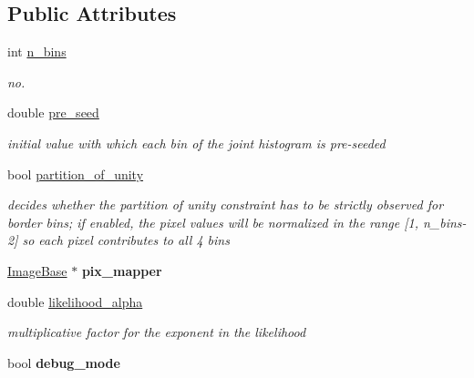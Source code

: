 \subsection*{Public Attributes}
\begin{DoxyCompactItemize}
\item 
int \hyperlink{structMIParams_a2e0e6ee1bd5cab5498d929798333798d}{n\-\_\-bins}
\begin{DoxyCompactList}\small\item\em no. \end{DoxyCompactList}\item 
double \hyperlink{structMIParams_a08f5a14dae9f3109340a5761812acfcf}{pre\-\_\-seed}
\begin{DoxyCompactList}\small\item\em initial value with which each bin of the joint histogram is pre-\/seeded \end{DoxyCompactList}\item 
\hypertarget{structMIParams_a4ec0963865cdf4d11c598fd4a0b00c15}{bool \hyperlink{structMIParams_a4ec0963865cdf4d11c598fd4a0b00c15}{partition\-\_\-of\-\_\-unity}}\label{structMIParams_a4ec0963865cdf4d11c598fd4a0b00c15}

\begin{DoxyCompactList}\small\item\em decides whether the partition of unity constraint has to be strictly observed for border bins; if enabled, the pixel values will be normalized in the range \mbox{[}1, n\-\_\-bins-\/2\mbox{]} so each pixel contributes to all 4 bins \end{DoxyCompactList}\item 
\hypertarget{structMIParams_ab98649fd9eaf55ccd1f5598abebd1d26}{\hyperlink{classImageBase}{Image\-Base} $\ast$ {\bfseries pix\-\_\-mapper}}\label{structMIParams_ab98649fd9eaf55ccd1f5598abebd1d26}

\item 
\hypertarget{structMIParams_a6078e752c2e4a5836030a5a29bf77d77}{double \hyperlink{structMIParams_a6078e752c2e4a5836030a5a29bf77d77}{likelihood\-\_\-alpha}}\label{structMIParams_a6078e752c2e4a5836030a5a29bf77d77}

\begin{DoxyCompactList}\small\item\em multiplicative factor for the exponent in the likelihood \end{DoxyCompactList}\item 
\hypertarget{structMIParams_a760ecb18e987f1a1f796ed1660887ff5}{bool {\bfseries debug\-\_\-mode}}\label{structMIParams_a760ecb18e987f1a1f796ed1660887ff5}

\end{DoxyCompactItemize}


